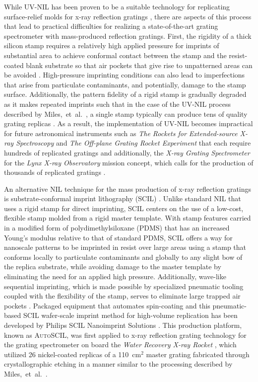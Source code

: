 \documentclass{osa-article}
\begin{document}
While UV-NIL has been proven to be a suitable technology for replicating surface-relief molds for x-ray reflection gratings \cite{McEntaffer13,Miles18}, there are aspects of this process that lead to practical difficulties for realizing a state-of-the-art grating spectrometer with mass-produced reflection gratings. 
First, the rigidity of a thick silicon stamp requires a relatively high applied pressure for imprints of substantial area to achieve conformal contact between the stamp and the resist-coated blank substrate so that air pockets that give rise to unpatterned areas can be avoided \cite{Schift10}. 
High-pressure imprinting conditions can also lead to imperfections that arise from particulate contaminants, and potentially, damage to the stamp surface. 
Additionally, the pattern fidelity of a rigid stamp is gradually degraded as it makes repeated imprints such that in the case of the UV-NIL process described by Miles,~et~al.~\cite{Miles18}, a single stamp typically can produce tens of quality grating replicas \cite{Schift10}. 
As a result, the implementation of UV-NIL becomes impractical for future astronomical instruments such as \emph{The Rockets for Extended-source X-ray Spectroscopy} \cite{Miles19b} and \emph{The Off-plane Grating Rocket Experiment} \cite{Tutt18} that each require hundreds of replicated gratings and additionally, the \emph{X-ray Grating Spectrometer} for the \emph{Lynx X-ray Observatory} mission concept, which calls for the production of thousands of replicated gratings \cite{McEntaffer19}. 

An alternative NIL technique for the mass production of x-ray reflection gratings is substrate-conformal imprint lithography (SCIL) \cite{Verschuuren17,Verschuuren18,Verschuuren19}. 
Unlike standard NIL that uses a rigid stamp for direct imprinting, SCIL centers on the use of a low-cost, flexible stamp molded from a rigid master template. 
With stamp features carried in a modified form of polydimethylsiloxane (PDMS) that has an increased Young's modulus relative to that of standard PDMS, SCIL offers a way for nanoscale patterns to be imprinted in resist over large areas using a stamp that conforms locally to particulate contaminants and globally to any slight bow of the replica substrate, while avoiding damage to the master template by eliminating the need for an applied high pressure. 
Additionally, wave-like sequential imprinting, which is made possible by specialized pneumatic tooling coupled with the flexibility of the stamp, serves to eliminate large trapped air pockets \cite{Verschuuren17,Verschuuren19}. 
Packaged equipment that automates spin-coating and this pneumatic-based SCIL wafer-scale imprint method for high-volume replication has been developed by Philips SCIL Nanoimprint Solutions \cite{scil_nano}. 
This production platform, known as \textsc{AutoSCIL}, was first applied to x-ray reflection grating technology for the grating spectrometer on board the \emph{Water Recovery X-ray Rocket} \cite{Miles19,Verschuuren18}, which utilized 26 nickel-coated replicas of a 110~cm$^2$ master grating fabricated through crystallographic etching in a manner similar to the processing described by Miles,~et~al.~\cite{Miles18}. 
\end{document}
